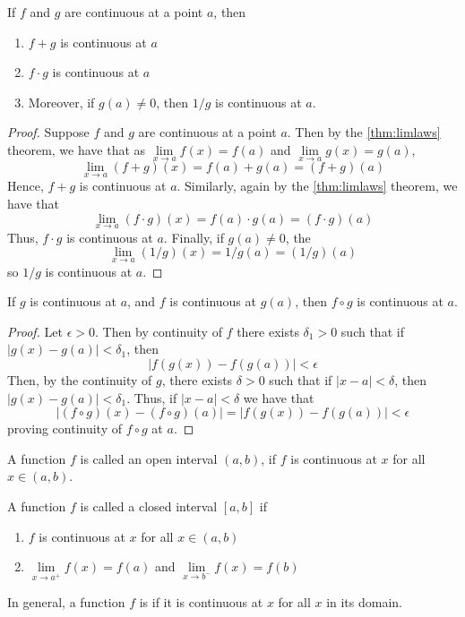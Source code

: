 \begin{thm}
    If $f$ and $g$ are continuous at a point $a$, then \begin{enumerate}
        \item $f+g$ is continuous at $a$
        \item $f\cdot g$ is continuous at $a$
        \item Moreover, if $g(a) \neq 0$, then $1/g$ is continuous at $a$.
    \end{enumerate}
\end{thm}
\begin{proof}
    Suppose $f$ and $g$ are continuous at a point $a$. Then by the \ref{thm:limlaws} theorem, we have that as $\lim\limits_{x\rightarrow a}f(x) = f(a)$ and $\lim\limits_{x\rightarrow a}g(x) = g(a)$, $$\lim\limits_{x\rightarrow a}(f+g)(x) = f(a) + g(a) = (f+g)(a)$$
    Hence, $f+g$ is continuous at $a$. Similarly, again by the \ref{thm:limlaws} theorem, we have that $$\lim\limits_{x\rightarrow a}(f\cdot g)(x) = f(a) \cdot g(a) = (f\cdot g)(a)$$
    Thus, $f\cdot g$ is continuous at $a$.
    Finally, if $g(a) \neq 0$, the $$\lim\limits_{x\rightarrow a}(1/g)(x) = 1/g(a) = (1/g)(a)$$
    so $1/g$ is continuous at $a$.
\end{proof}


\begin{thm}
    If $g$ is continuous at $a$, and $f$ is continuous at $g(a)$, then $f\circ g$ is continuous at $a$.
\end{thm}
\begin{proof}
    Let $\epsilon > 0$. Then by continuity of $f$ there exists $\delta_1 > 0$ such that if $|g(x) - g(a)| < \delta_1$, then $$|f(g(x)) - f(g(a))| < \epsilon$$
    Then, by the continuity of $g$, there exists $\delta > 0$ such that if $|x-a| < \delta$, then $|g(x) - g(a)| < \delta_1$. Thus, if $|x-a| < \delta$ we have that $$|(f\circ g)(x) - (f\circ g)(a)| = |f(g(x)) - f(g(a))| < \epsilon$$
    proving continuity of $f\circ g$ at $a$.
\end{proof}


\begin{defn}
    A function $f$ is called  an open interval $(a,b)$, if $f$ is continuous at $x$ for all $x \in (a,b)$.

    A function $f$ is called  a closed interval $[a,b]$ if \begin{enumerate}
        \item $f$ is continuous at $x$ for all $x \in (a,b)$
        \item $\lim\limits_{x\rightarrow a^+}f(x) = f(a)$ and $\lim\limits_{x\rightarrow b^-}f(x) = f(b)$
    \end{enumerate}

    In general, a function $f$ is  if it is continuous at $x$ for all $x$ in its domain.
\end{defn}


